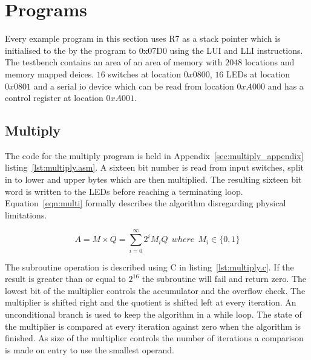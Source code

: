 

\section{Programs}
Every example program in this section uses R7 as a stack pointer which is initialised to the by the program to 0x07D0 using the LUI and LLI instructions.
The testbench contains an area of an area of memory with $2048$ locations and memory mapped deices.
$16$ switches at location $0x0800$, $16$ LEDs at location $0x0801$ and a serial io device which can be read from location $0xA000$ and has a control register at location $0xA001$. 




\subsection{Multiply}
\label{sec:multiply}
The code for the multiply program is held in Appendix~\ref{sec:multiply_appendix} listing~\ref{lst:multiply.asm}.
A sixteen bit number is read from input switches, split in to lower and upper bytes which are then multiplied.
The resulting sixteen bit word is written to the LEDs before reaching a terminating loop.
Equation~\eqref{eqn:multi} formally describes the algorithm disregarding physical limitations.

\begin{equation}
	A = M \times Q = \sum_{i=0}^{\infty} 2^i M_i Q\:\:where\:\:M_i \in \{0,1\}
   \label{eqn:multi}
\end{equation}



The subroutine operation is described using C in listing~\ref{lst:multiply.c}. 
If the result is greater than or equal to $2^{16}$ the subroutine will fail and return zero.
The lowest bit of the multiplier controls the accumulator and the overflow check.
The multiplier is shifted right and the quotient is shifted left at every iteration.
An unconditional branch is used to keep the algorithm in a while loop. 
The state of the multiplier is compared at every iteration against zero when the algorithm is finished.
As size of the multiplier controls the number of iterations a comparison is made on entry to use the smallest operand.










